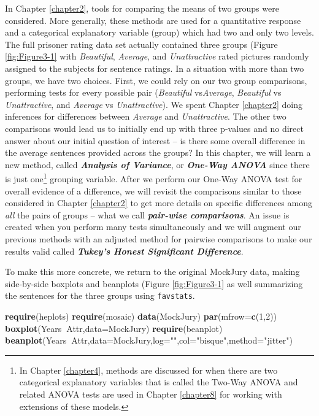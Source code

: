 \documentclass[]{book}
\newenvironment{Shaded}{\begin{snugshade}}{\end{snugshade}}
\newcommand{\KeywordTok}[1]{\textcolor[rgb]{0.13,0.29,0.53}{\textbf{#1}}}
\newcommand{\DataTypeTok}[1]{\textcolor[rgb]{0.13,0.29,0.53}{#1}}
\newcommand{\DecValTok}[1]{\textcolor[rgb]{0.00,0.00,0.81}{#1}}
\newcommand{\StringTok}[1]{\textcolor[rgb]{0.31,0.60,0.02}{#1}}
\newcommand{\OperatorTok}[1]{\textcolor[rgb]{0.81,0.36,0.00}{\textbf{#1}}}
\newcommand{\NormalTok}[1]{#1}
\let\rmarkdownfootnote\footnote%
\def\footnote{\protect\rmarkdownfootnote}
\begin{document}
In Chapter \ref{chapter2}, tools for comparing the means of two groups
were considered. More generally, these methods are used for a
quantitative response and a categorical explanatory variable (group)
which had two and only two levels. The full prisoner rating data set
actually contained three groups (Figure \ref{fig:Figure3-1} with
\emph{Beautiful}, \emph{Average}, and \emph{Unattractive} rated pictures
randomly assigned to the subjects for sentence ratings. In a situation
with more than two groups, we have two choices. First, we could rely on
our two group comparisons, performing tests for every possible pair
(\emph{Beautiful} vs\emph{Average}, \emph{Beautiful} vs
\emph{Unattractive}, and \emph{Average} vs \emph{Unattractive}). We
spent Chapter \ref{chapter2} doing inferences for differences between
\emph{Average} and \emph{Unattractive}. The other two comparisons would
lead us to initially end up with three p-values and no direct answer
about our initial question of interest -- is there some overall
difference in the average sentences provided across the groups? In this
chapter, we will learn a new method, called \textbf{\emph{Analysis of
Variance}}, or \textbf{\emph{One-Way ANOVA}} since there is just
one\footnote{In Chapter \ref{chapter4}, methods are discussed for when
  there are two categorical explanatory variables that is called the
  Two-Way ANOVA and related ANOVA tests are used in Chapter
  \ref{chapter8} for working with extensions of these models.} grouping
variable. After we perform our One-Way ANOVA test for overall evidence
of a difference, we will revisit the comparisons similar to those
considered in Chapter \ref{chapter2} to get more details on specific
differences among \emph{all} the pairs of groups -- what we call
\textbf{\emph{pair-wise comparisons}}. An issue is created when you
perform many tests simultaneously and we will augment our previous
methods with an adjusted method for pairwise comparisons to make our
results valid called \textbf{\emph{Tukey's Honest Significant
Difference}}.

To make this more concrete, we return to the original MockJury data,
making side-by-side boxplots and beanplots (Figure \ref{fig:Figure3-1}
as well summarizing the sentences for the three groups using
\texttt{favstats}.




\begin{Shaded}
\begin{Highlighting}[]
\KeywordTok{require}\NormalTok{(heplots)}
\KeywordTok{require}\NormalTok{(mosaic)}
\KeywordTok{data}\NormalTok{(MockJury)}
\KeywordTok{par}\NormalTok{(}\DataTypeTok{mfrow=}\KeywordTok{c}\NormalTok{(}\DecValTok{1}\NormalTok{,}\DecValTok{2}\NormalTok{))}
\KeywordTok{boxplot}\NormalTok{(Years}\OperatorTok{~}\NormalTok{Attr,}\DataTypeTok{data=}\NormalTok{MockJury)}
\KeywordTok{require}\NormalTok{(beanplot)}
\KeywordTok{beanplot}\NormalTok{(Years}\OperatorTok{~}\NormalTok{Attr,}\DataTypeTok{data=}\NormalTok{MockJury,}\DataTypeTok{log=}\StringTok{""}\NormalTok{,}\DataTypeTok{col=}\StringTok{"bisque"}\NormalTok{,}\DataTypeTok{method=}\StringTok{"jitter"}\NormalTok{)}
\end{Highlighting}
\end{Shaded}
\end{document}
